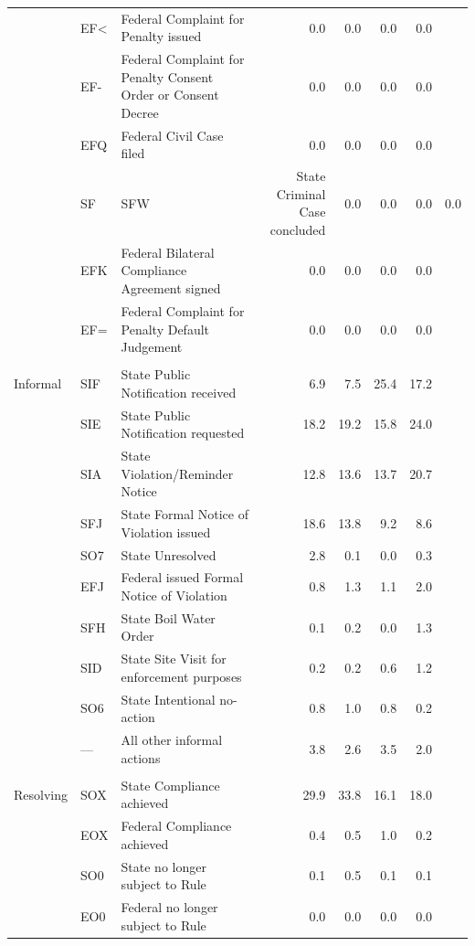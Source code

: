 \begin{table}[htbp]
\begin{tabular}{llp{5.8cm}rrrr}
 & EF< & Federal Complaint for Penalty issued & 0.0 & 0.0 & 0.0 & 0.0 \\
 & EF- & Federal Complaint for Penalty Consent Order or Consent Decree & 0.0 & 0.0 & 0.0 & 0.0 \\
 & EFQ & Federal Civil Case filed & 0.0 & 0.0 & 0.0 & 0.0 \\
 & SF%
 & SFW & State Criminal Case concluded & 0.0 & 0.0 & 0.0 & 0.0 \\
 & EFK & Federal Bilateral Compliance Agreement signed & 0.0 & 0.0 & 0.0 & 0.0 \\
 & EF= & Federal Complaint for Penalty Default Judgement & 0.0 & 0.0 & 0.0 & 0.0 \\
\addlinespace[4pt]
 \\
\addlinespace[2pt]
Informal & SIF & State Public Notification received & 6.9 & 7.5 & 25.4 & 17.2 \\
 & SIE & State Public Notification requested & 18.2 & 19.2 & 15.8 & 24.0 \\
 & SIA & State Violation/Reminder Notice & 12.8 & 13.6 & 13.7 & 20.7 \\
 & SFJ & State Formal Notice of Violation issued & 18.6 & 13.8 & 9.2 & 8.6 \\
 & SO7 & State Unresolved & 2.8 & 0.1 & 0.0 & 0.3 \\
 & EFJ & Federal issued Formal Notice of Violation & 0.8 & 1.3 & 1.1 & 2.0 \\
 & SFH & State Boil Water Order & 0.1 & 0.2 & 0.0 & 1.3 \\
 & SID & State Site Visit for enforcement purposes & 0.2 & 0.2 & 0.6 & 1.2 \\
 & SO6 & State Intentional no-action & 0.8 & 1.0 & 0.8 & 0.2 \\
 & — & All other informal actions & 3.8 & 2.6 & 3.5 & 2.0 \\
\addlinespace[4pt]
 \\
\addlinespace[2pt]
Resolving & SOX & State Compliance achieved & 29.9 & 33.8 & 16.1 & 18.0 \\
 & EOX & Federal Compliance achieved & 0.4 & 0.5 & 1.0 & 0.2 \\
 & SO0 & State no longer subject to Rule & 0.1 & 0.5 & 0.1 & 0.1 \\
 & EO0 & Federal no longer subject to Rule & 0.0 & 0.0 & 0.0 & 0.0 \\

\end{tabular}
\end{table}
